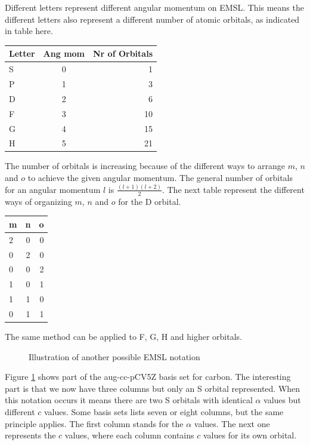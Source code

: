 \documentclass[a4paper,norsk,11pt,twoside]{report}
\begin{document}
Different letters represent different angular momentum on EMSL. This means the different letters also represent a different number of atomic orbitals, as indicated in table here. \\

\begin{center}
\begin{tabular}{ l c r }
\hline
  Letter & Ang mom & Nr of Orbitals \\ \hline
  S & 0 & 1 \\
  P & 1 & 3 \\
  D & 2 & 6 \\
  F & 3 & 10 \\
  G & 4 & 15 \\
  H & 5 & 21 \\
  \hline
\end{tabular}
\end{center}

The number of orbitals is increasing because of the different ways to
arrange $m$, $n$ and $o$ to achieve the given angular momentum. The
general number of orbitals for an angular momentum $l$ is
$\frac{(l+1)(l+2)}{2}$. The next table represent the different ways of
organizing $m$, $n$ and $o$ for the D orbital.\\

\begin{center}
\begin{tabular}{ l c r }
\hline
  m & n & o \\ \hline
  2 & 0 & 0 \\
  0 & 2 & 0 \\
  0 & 0 & 2 \\
  1 & 0 & 1 \\
  1 & 1 & 0 \\
  0 & 1 & 1 \\
  \hline
\end{tabular}
\end{center}

The same method can be applied to F, G, H and higher orbitals.  \\

\begin{figure}[h!]
\begin{center}
\caption{Illustration of another possible EMSL notation}
\label{fig:emsl2}
\end{center}
\end{figure}

Figure \ref{fig:emsl2} shows part of the aug-cc-pCV5Z basis set for
carbon. The interesting part is that we now have three columns but only an
S orbital represented. When this notation occurs it means there are
two S orbitals with identical $\alpha$ values but different $c$
values. Some basis sets lists seven or eight columns, but the same principle
applies. The first column stands for the  $\alpha$ values. The next one represents  the $c$ values,
where each column contains $c$ values for its own orbital.
\end{document}
